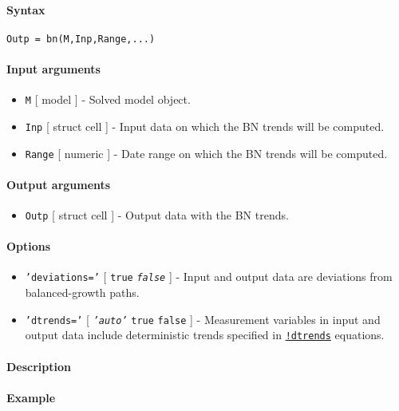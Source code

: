 


	\paragraph{Syntax}\label{syntax}

\begin{verbatim}
Outp = bn(M,Inp,Range,...)
\end{verbatim}

\paragraph{Input arguments}\label{input-arguments}

\begin{itemize}
\item
  \texttt{M} {[} model {]} - Solved model object.
\item
  \texttt{Inp} {[} struct \textbar{} cell {]} - Input data on which the
  BN trends will be computed.
\item
  \texttt{Range} {[} numeric {]} - Date range on which the BN trends
  will be computed.
\end{itemize}

\paragraph{Output arguments}\label{output-arguments}

\begin{itemize}
\itemsep1pt\parskip0pt
\item
  \texttt{Outp} {[} struct \textbar{} cell {]} - Output data with the BN
  trends.
\end{itemize}

\paragraph{Options}\label{options}

\begin{itemize}
\item
  \texttt{'deviations='} {[} \texttt{true} \textbar{}
  \emph{\texttt{false}} {]} - Input and output data are deviations from
  balanced-growth paths.
\item
  \texttt{'dtrends='} {[} \emph{\texttt{'auto'}} \textbar{}
  \texttt{true} \textbar{} \texttt{false} {]} - Measurement variables in
  input and output data include deterministic trends specified in
  \href{modellang/dtrends}{\texttt{!dtrends}} equations.
\end{itemize}

\paragraph{Description}\label{description}

\paragraph{Example}\label{example}


